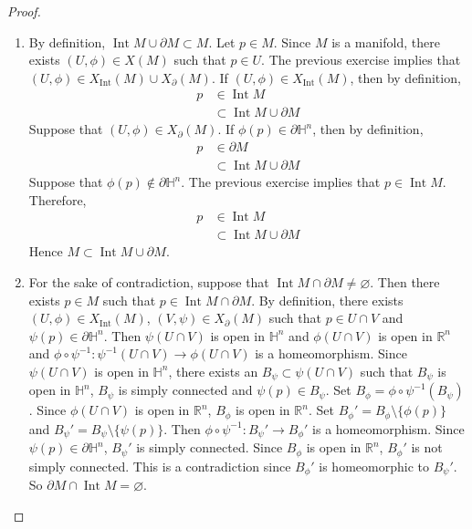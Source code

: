 \documentclass[12pt]{amsart}
\theoremstyle{definition}
\renewcommand{\H}{\mathbb{H}}
\newcommand{\R}{\mathbb{R}}
\newcommand{\p}{\partial}
\DeclareMathOperator{\Int}{Int}
\begin{document}
	\begin{proof}\
		\begin{enumerate}
			\item By definition, $\Int M \cup \p M \subset M$. Let $p \in M$. Since $M$ is a manifold, there exists $(U, \phi) \in X(M)$ such that $p \in U$. The previous exercise implies that $(U, \phi) \in X_{\Int}(M) \cup X_{\p}(M)$. If $(U, \phi) \in X_{\Int}(M)$, then by definition, 
			\begin{align*}
				p 
				& \in \Int M \\
				& \subset \Int M \cup \p M
			\end{align*}        
			Suppose that $(U, \phi) \in X_{\p}(M)$. If $\phi(p) \in \p \H^n$, then by definition, 
			\begin{align*}
				p 
				& \in \p M \\
				& \subset \Int M \cup \p M
			\end{align*}   
			Suppose that $\phi(p) \not \in \p \H^n$. The previous exercise implies that $p \in \Int M$. Therefore, 
			\begin{align*}
				p 
				& \in \Int M \\
				& \subset \Int M \cup \p M
			\end{align*}        
			Hence $M \subset \Int M \cup \p M$.
			\item For the sake of contradiction, suppose that $\Int M \cap \p M \neq \varnothing$. Then there exists $p \in M$ such that $p \in \Int M \cap \p M$. By definition, there exists $(U, \phi) \in X_{\Int}(M)$, $(V, \psi) \in X_{\p}(M)$ such that $p \in U \cap V$ and $\psi(p) \in \p \H^n$. Then $\psi(U \cap V)$ is open in $\H^n$ and $\phi(U \cap V)$ is open in $\R^n$ and $\phi \circ \psi^{-1}: \psi^{-1}(U \cap V) \rightarrow \phi(U \cap V)$ is a homeomorphism. Since $\psi(U \cap V)$ is open in $\H^n$, there exists an $B_{\psi} \subset \psi(U \cap V)$ such that $B_{\psi}$ is open in $\H^n$, $B_{\psi}$ is simply connected and $\psi(p) \in B_{\psi}$. Set $B_{\phi} = \phi \circ \psi^{-1}(B_{\psi})$. Since $\phi(U \cap V)$ is open in $\R^n$, $B_{\phi}$ is open in $\R^n$. Set $B_{\phi}' = B_{\phi} \setminus \{\phi(p)\}$ and $B_{\psi}' = B_{\psi} \setminus \{\psi(p)\}$. Then $\phi \circ \psi^{-1}: B_{\psi}' \rightarrow B_{\phi}'$ is a homeomorphism. Since $\psi(p) \in \p \H^n$, $B_{\psi}'$ is simply connected. Since $B_{\phi}$ is open in $\R^n$, $B_{\phi}'$ is not simply connected. This is a contradiction since $B_{\phi}'$ is homeomorphic to $B_{\psi}'$. So $\p M \cap \Int M = \varnothing$. 
		\end{enumerate}
	\end{proof}
\end{document}
